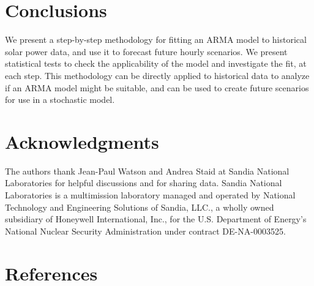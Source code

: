 \documentclass[review]{elsarticle}
\begin{document}
\section*{Conclusions}
We present a step-by-step methodology for fitting an ARMA model to 
historical solar power data, and use it to forecast future hourly scenarios. We 
present statistical tests to check the applicability of the model and 
investigate the fit, at each step. This methodology can be directly applied to 
historical data to analyze if an ARMA model might be suitable, and can be used 
to create future scenarios for use in a stochastic model.


\section*{Acknowledgments} 
The authors thank Jean-Paul Watson and Andrea Staid at Sandia National 
Laboratories for helpful discussions and for sharing data. 
Sandia National Laboratories is a multimission laboratory managed and operated 
by National Technology and Engineering Solutions of Sandia, LLC., a wholly owned
subsidiary of Honeywell International, Inc., for the U.S. Department of 
Energy's 
National Nuclear Security Administration under contract DE-NA-0003525.

\section*{References}


\end{document}
